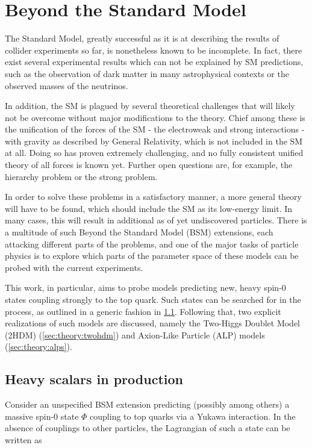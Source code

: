 \section{Beyond the Standard Model}
\label{sec:theory:bsm}

The Standard Model, greatly successful as it is at describing the results of collider experiments so far, is nonetheless known to be incomplete. In fact, there exist several experimental results which can not be explained by SM predictions, such as the observation of dark matter in many astrophysical contexts or the observed masses of the neutrinos. 

In addition, the SM is plagued by several theoretical challenges that will likely not be overcome without major modifications to the theory. Chief among these is the unification of the forces of the SM - the electroweak and strong interactions - with gravity as described by General Relativity, which is not included in the SM at all. Doing so has proven extremely challenging, and no fully consistent unified theory of all forces is known yet. Further open questions are, for example, the hierarchy problem or the strong \CP problem.

In order to solve these problems in a satisfactory manner, a more general theory will have to be found, which should include the SM as its low-energy limit. In many cases, this will result in additional as of yet undiscovered particles. There is a multitude of such Beyond the Standard Model (BSM) extensions, each attacking different parts of the problems, and one of the major tasks of particle physics is to explore which parts of the parameter space of these models can be probed with the current experiments.

This work, in particular, aims to probe models predicting new, heavy spin-0 states coupling strongly to the top quark. Such states can be searched for in the \pptt process, as outlined in a generic fashion in \cref{sec:theory:ah}. Following that, two explicit realizations of such models are discussed, namely the Two-Higgs Doublet Model (2HDM) (\cref{sec:theory:twohdm}) and Axion-Like Particle (ALP) models (\cref{sec:theory:alps}).

\subsection{Heavy scalars in \ttbartitle production}
\label{sec:theory:ah}

Consider an unspecified BSM extension predicting (possibly among others) a massive spin-0 state $\Phi$ coupling to top quarks via a Yukawa interaction. In the absence of couplings to other particles, the Lagrangian of such a state can be written as~\cite{Maltoni:2024tul}

